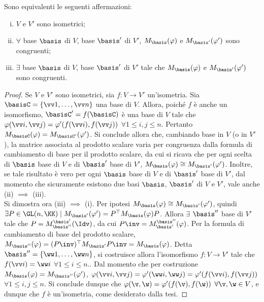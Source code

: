\documentclass[11pt]{article}
\begin{document}
	\begin{proposition} Sono equivalenti le seguenti affermazioni:
		
		\begin{enumerate}[(i)]
			\item $V$ e $V'$ sono isometrici;
			\item $\forall$ base $\basis$ di $V$, base $\basis'$ di $V'$,
			$M_\basis(\varphi)$ e $M_{\basis'}(\varphi')$ sono congruenti;
			\item $\exists$ base $\basis$ di $V$, base $\basis'$ di $V'$ tale che
			$M_\basis(\varphi)$ e $M_{\basis'}(\varphi')$ sono congruenti.
		\end{enumerate}
	\end{proposition}

	\begin{proof} Se $V$ e $V'$ sono isometrici, sia $f : V \to V'$ un'isometria. Sia $\basisC = \{ \vv 1, \ldots, \vv n \}$ una base di $V$. Allora, poiché $f$ è anche un isomorfismo, $\basisC' = f(\basisC)$ è una base di $V$ tale che
		$\varphi(\vv i, \vv j) = \varphi'(f(\vv i), f(\vv j))$ $\forall 1 \leq i, j \leq n$. Pertanto $M_\basisC(\varphi) = M_{\basisC'}(\varphi')$. Si conclude allora che, cambiando base in $V$ (o in $V'$), la matrice associata
		al prodotto scalare varia per congruenza dalla formula di cambiamento di base per il prodotto scalare, da cui si ricava che per ogni scelta di $\basis$ base di $V$ e di $\basis'$ base di $V'$, $M_\basis(\varphi) \cong M_{\basis'}(\varphi')$. Inoltre, se tale risultato è vero per ogni $\basis$ base di $V$ e di $\basis'$ base di $V'$, dal momento che sicuramente esistono due basi $\basis$, $\basis'$ di $V$ e $V'$, vale anche (ii) $\implies$ (iii). \\
		
		Si dimostra ora (iii) $\implies$ (i). Per ipotesi $M_\basis(\varphi) \cong M_{\basis'}(\varphi')$, quindi
		$\exists P \in \GL(n, \KK) \mid M_{\basis'}(\varphi') = P^\top M_\basis(\varphi) P$. Allora $\exists$ $\basis''$
		base di $V'$ tale che $P = M_{\basis''}^{\basis'}(\Idv)$, da cui $P\inv = M_{\basis'}^{\basis''}(\varphi)$. Per la formula di cambiamento di base del prodotto
		scalare, $M_{\basis''}(\varphi) = (P\inv)^\top M_{\basis'} P\inv = M_\basis(\varphi)$. Detta
		$\basis'' = \{ \ww 1, \ldots, \ww n \}$, si costruisce allora l'isomorfismo $f : V \to V'$ tale
		che $f(\vv i) = \ww i$ $\forall 1 \leq i \leq n$.. Dal momento che per costruzione $M_\basis(\varphi) = M_{\basis''}(\varphi')$,
		$\varphi(\vv i, \vv j) = \varphi'(\ww i, \ww j) = \varphi'(f(\vv i), f(\vv j))$ $\forall 1 \leq i, j \leq n$.
		Si conclude dunque che $\varphi(\v, \w) = \varphi'(f(\v), f(\w))$ $\forall \v, \w \in V$, e dunque
		che $f$ è un'isometria, come desiderato dalla tesi. 
	\end{proof}
\end{document}
